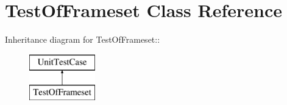 \hypertarget{class_test_of_frameset}{
\section{TestOfFrameset Class Reference}
\label{class_test_of_frameset}
}
Inheritance diagram for TestOfFrameset::\begin{figure}[H]
\begin{center}
\leavevmode
\includegraphics[height=2cm]{class_test_of_frameset}
\end{center}
\end{figure}
